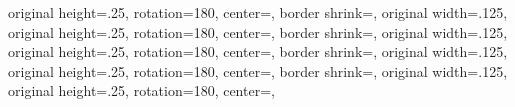 {{	original height=.25\pgfpageoptionwidth,%
	rotation=180,%
	center=\pgfpoint{.25\pgfphysicalwidth}{.125\pgfphysicalheight},%
  }%
  {%
	border shrink=\pgfpageoptionborder,%
	original width=.125\pgfpageoptionheight,%
	original height=.25\pgfpageoptionwidth,%
	rotation=180,%
	center=\pgfpoint{1\pgfphysicalwidth}{0\pgfphysicalheight},%
  }%
  {%
	border shrink=\pgfpageoptionborder,%
	original width=.125\pgfpageoptionheight,%
	original height=.25\pgfpageoptionwidth,%
	rotation=180,%
	center=\pgfpoint{0.75\pgfphysicalwidth}{0\pgfphysicalheight},%
	}%
  {%
	border shrink=\pgfpageoptionborder,%
	original width=.125\pgfpageoptionheight,%
	original height=.25\pgfpageoptionwidth,%
	rotation=180,%
	center=\pgfpoint{.5\pgfphysicalwidth}{0\pgfphysicalheight},%
  }%
  {%
	border shrink=\pgfpageoptionborder,%
	original width=.125\pgfpageoptionheight,%
	original height=.25\pgfpageoptionwidth,%
	rotation=180,%
	center=\pgfpoint{.25\pgfphysicalwidth}{0\pgfphysicalheight},%
  }%
}%